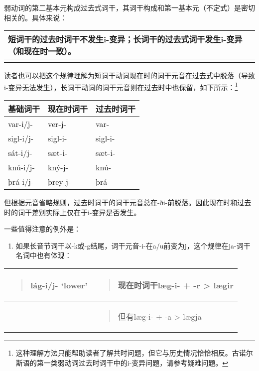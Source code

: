 弱动词的第二基本元构成过去式词干，其词干构成和第一基本元（不定式）是密切相关的。具体来说：

\begin{longtable}{l}
  \toprule
  短词干的过去时词干不发生i-变异；长词干的过去式词干发生i-变异（和现在时一致）。 \\
  \midrule
  \endhead
  \bottomrule
  \endfoot
\end{longtable}

读者也可以把这个规律理解为短词干动词现在时的词干元音在过去式中脱落（导致i-变异无法发生），长词干动词的词干元音则在过去时中也保留，如下所示：\footnote{这种理解方法只能帮助读者了解共时问题，但它与历史情况恰恰相反。古诺尔斯语的第一类弱动词过去时词干中的i-变异问题，请参考疑难问题。}

\begin{longtable}{lll}
  \toprule
  基础词干  & 现在时词干 & 过去时词干 \\
  \midrule
  \endhead
  \bottomrule
  \endfoot
  var-i/j-  & ver-j-     & var-       \\
  sigl-i/j- & sigl-i-    & sigl-i-    \\
  sát-i/j-  & sæt-i-     & sæt-i-     \\
  knú-i/j-  & kný-j-     & knú-       \\
  þrá-i/j-  & þrey-j-    & þrá-       \\
\end{longtable}

但根据元音省略规则，过去时词干的词干元音总在-ði-前脱落。因此现在时和过去时的词干差别实际上仅在于i-变异是否发生。

一些值得注意的例外是：

\begin{enumerate}
  \def\labelenumi{\arabic{enumi})}
  \item
        如果长音节词干以-k或-g结尾，词干元音-i-在a/u前变为j，这个规律在ja-词干名词中也有体现：
\end{enumerate}

\begin{longtable}{ll}
  \toprule
  \begin{quote}lág-i/j- `lower‌'\end{quote} & \begin{quote}现在时词干læg-i- + -r \textgreater{} lægir\end{quote} \\
  \midrule
  \endhead
  \bottomrule
  \endfoot
                                           & \begin{minipage}[t]{\linewidth}\raggedright
                                               \begin{quote}
      但有læg-i- + -a \textgreater{} lægja
    \end{quote}
                                             \end{minipage}                         \\
\end{longtable}

